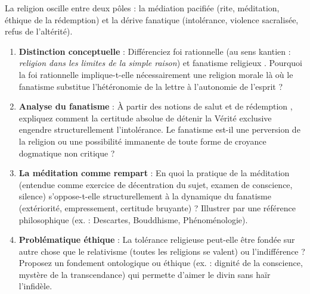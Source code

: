 \documentclass[11pt]{article}
\begin{document}
\begin{exercice}
La religion oscille entre deux pôles : la médiation pacifiée (rite, méditation, éthique de la rédemption) et la dérive fanatique (intolérance, violence sacralisée, refus de l'altérité).
\begin{enumerate}
    \item \textbf{Distinction conceptuelle} : Différenciez \og foi rationnelle \fg{} (au sens kantien : \textit{religion dans les limites de la simple raison}) et \og fanatisme religieux \fg{}. Pourquoi la foi rationnelle implique-t-elle nécessairement une \og religion morale \fg{} là où le fanatisme substitue l'hétéronomie de la lettre à l'autonomie de l'esprit ?
    \item \textbf{Analyse du fanatisme} : À partir des notions de \og salut \fg{} et de \og rédemption \fg{}, expliquez comment la certitude absolue de détenir la Vérité exclusive engendre structurellement l'intolérance. Le fanatisme est-il une \og perversion \fg{} de la religion ou une \og possibilité immanente \fg{} de toute forme de croyance dogmatique non critique ?
    \item \textbf{La méditation comme rempart} : En quoi la pratique de la \og méditation \fg{} (entendue comme exercice de décentration du sujet, examen de conscience, silence) s'oppose-t-elle structurellement à la dynamique du fanatisme (extériorité, empressement, certitude bruyante) ? Illustrer par une référence philosophique (ex. : Descartes, Bouddhisme, Phénoménologie).
    \item \textbf{Problématique éthique} : La \og tolérance religieuse \fg{} peut-elle être fondée sur autre chose que le relativisme (toutes les religions se valent) ou l'indifférence ? Proposez un fondement ontologique ou éthique (ex. : dignité de la conscience, mystère de la transcendance) qui permette d'aimer le divin sans haïr l'infidèle.
\end{enumerate}
\end{exercice}
\end{document}
